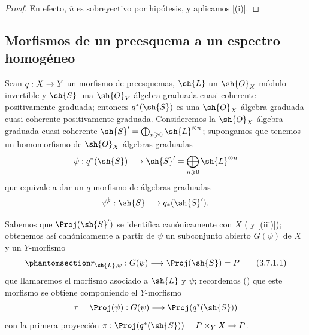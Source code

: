 \documentclass[oneside,10pt]{amsart}
\makeatletter
\renewcommand{\geq}{\geqslant}
\newcommand{\ega@arrow}[2]{\mathchoice{#1}{#2}{#2}{#2}}
\renewcommand{\to}{\ega@arrow{\longrightarrow}{\rightarrow}}
\newcommand{\oldpage}[2][]{\marginnote{\normalfont\footnotesize\textbf{#1}~|~#2}\ignorespaces}
\let\EGAOriginalLabel\label
\renewcommand{\label}[1]{\phantomsection\EGAOriginalLabel{#1}}
\makeatother
\begin{document}
\begin{proof}
En efecto, $\overline{u}$ es sobreyectivo por hipótesis, y aplicamos [(i)].
\end{proof}

\subsection{Morfismos de un preesquema a un espectro homogéneo}
\label{subsection:II.3.7}

\begin{env}[3.7.1]
\label{II.3.7.1}
Sean $q:X\to Y$ un morfismo de preesquemas, $\sh{L}$ un $\sh{O}_X$-módulo invertible y $\sh{S}$ una $\sh{O}_Y$-álgebra graduada cuasi-coherente positivamente graduada;
entonces $q^*(\sh{S})$ es una $\sh{O}_X$-álgebra graduada cuasi-coherente positivamente graduada.
Consideremos la $\sh{O}_X$-álgebra graduada cuasi-coherente $\sh{S}'=\bigoplus_{n\geq0}\sh{L}^{\otimes n}$;
supongamos que tenemos un homomorfismo de $\sh{O}_X$-álgebras graduadas
\[
  \psi : q^*(\sh{S}) \to \sh{S}' = \bigoplus_{n\geq0}\sh{L}^{\otimes n}
\]
que equivale a dar un $q$-morfismo de álgebras graduadas
\[
  \psi^\flat : \sh{S} \to q_*(\sh{S}').
\]

Sabemos que $\Proj(\sh{S}')$ se identifica canónicamente con $X$ ( y [(iii)]);
obtenemos así canónicamente a partir de $\psi$ un subconjunto abierto $G(\psi)$ de $X$ y un $Y$-morfismo
\[
\label{II.3.7.1.1}
  r_{\sh{L},\psi} : G(\psi) \to \Proj(\sh{S}) = P
\tag{3.7.1.1}
\]
\oldpage[II]{66}
que llamaremos el morfismo asociado a $\sh{L}$ y $\psi$;
recordemos () que este morfismo se obtiene componiendo el $Y$-morfismo
\[
  \tau = \Proj(\psi) : G(\psi) \to \Proj(q^*(\sh{S}))
\]
con la primera proyección $\pi:\Proj(q^*(\sh{S}))=P\times_Y X\to P$.
\end{env}
\end{document}
